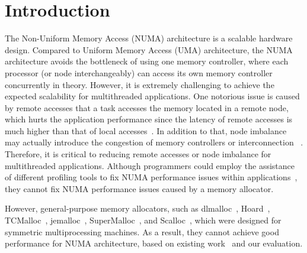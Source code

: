 



\section{Introduction}
\label{sec:intro}

The Non-Uniform Memory Access (NUMA) architecture is a scalable hardware design. Compared to Uniform Memory Access (UMA) architecture, the NUMA architecture avoids the bottleneck of using one memory controller, where each processor (or node interchangeably) can access its own memory controller concurrently in theory. However, it is extremely challenging to achieve the expected scalability for multithreaded applications. One notorious issue is caused by remote accesses that a task accesses the memory located in a remote node, which hurts the application performance since the latency of remote accesses is much higher than that of local accesses~\cite{Blagodurov:2011:CNC:2002181.2002182}. In addition to that, node imbalance may actually introduce the congestion of memory controllers or interconnection ~\cite{Blagodurov:2011:CNC:2002181.2002182}. Therefore, it is critical to reducing remote accesses or node imbalance for multithreaded applications. Although programmers could employ the assistance of different profiling tools to fix NUMA performance issues within applications~\cite{Intel:VTune, Memphis, Lachaize:2012:MMP:2342821.2342826, XuNuma, NumaMMA, 7847070, NumaPerf}, they cannot fix NUMA performance issues caused by a memory allocator.

However, general-purpose memory allocators, such as dlmalloc~\cite{dlmalloc},  Hoard~\cite{Hoard}, TCMalloc~\cite{tcmalloc}, jemalloc~\cite{jemalloc}, SuperMalloc~\cite{supermalloc}, and  Scalloc~\cite{Scalloc}, which were designed for symmetric multiprocessing machines. As a result, they cannot achieve good performance for NUMA architecture, based on existing work~\cite{tcmallocnew, yang2019jarena} and our evaluation. 

